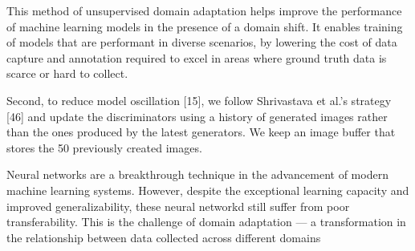\justifying
\setlength{\parskip}{1em}




This method of unsupervised domain adaptation helps improve the performance of machine learning models in the presence of a domain shift. It enables training of models that are performant in diverse scenarios, by lowering the cost of data capture and annotation required to excel in areas where ground truth data is scarce or hard to collect.








Second, to reduce model oscillation [15], we follow
Shrivastava et al.’s strategy [46] and update the discriminators
using a history of generated images rather than the
ones produced by the latest generators. We keep an image
buffer that stores the 50 previously created images.



Neural networks are a breakthrough technique in the advancement of modern machine learning systems. However, despite the exceptional learning capacity and improved generalizability, these neural networkd still suffer from poor transferability. This is the challenge of domain adaptation — a transformation in the relationship between data collected across different domains 